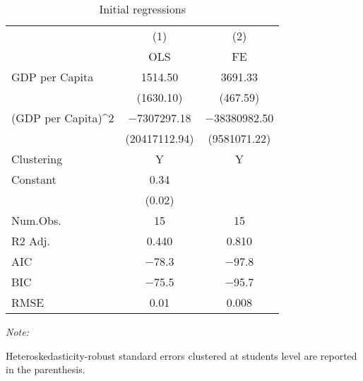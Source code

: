 \begin{table}

\caption{Initial regressions}
\centering
\begin{threeparttable}
\begin{tabular}[t]{lcc}
\midrule\midrule
\multicolumn{1}{c}{ } & \multicolumn{1}{c}{(1)} & \multicolumn{1}{c}{(2)} \\
\cmidrule(l{3pt}r{3pt}){2-2} \cmidrule(l{3pt}r{3pt}){3-3}
  & OLS & FE\\
\midrule
GDP per Capita & \num{1514.50} & \num{3691.33}\\
 & (\num{1630.10}) & (\num{467.59})\\
(GDP per Capita)\textasciicircum{}2 & \num{-7307297.18} & \num{-38380982.50}\\
 & (\num{20417112.94}) & (\num{9581071.22})\\
Clustering & Y & Y\\
Constant & \num{0.34} & \\
 & (\num{0.02}) & \\
\midrule
Num.Obs. & \num{15} & \num{15}\\
R2 Adj. & \num{0.440} & \num{0.810}\\
AIC & \num{-78.3} & \num{-97.8}\\
BIC & \num{-75.5} & \num{-95.7}\\
RMSE & \num{0.01} & \num{0.008}\\
\midrule\midrule
\end{tabular}
\begin{tablenotes}
\item \textit{Note: } 
\item Heteroskedasticity-robust standard errors clustered at students level are reported in the parenthesis.
\end{tablenotes}
\end{threeparttable}
\end{table}
